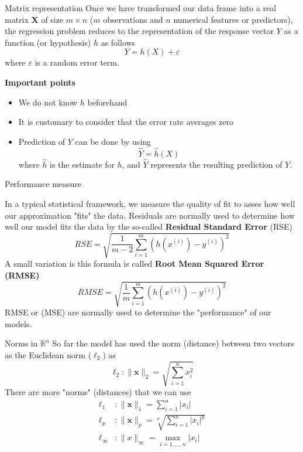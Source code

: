 \documentclass{beamer}
\begin{document}
\begin{frame}{Matrix representation}
	Once we have transformed our data frame into a real matrix $\mathbf{X}$ of size $m \times n$ ($m$ observations and $n$ numerical features or predictors), the regression problem reduces to the representation of the response vector $Y$ as a function (or hypothesis) $h$ as follows
	\begin{equation}
		Y= h(X)+ \varepsilon
	\end{equation}
where $\varepsilon$ is a random error term. 

{\bf Important points}

\begin{itemize}
	\item We do not know $h$ beforehand
	\item It is customary to consider that the error rate averages zero
	\item Prediction of $Y$ can be done by using
	\begin{equation*}
		\hat{Y}= \hat{h} (X)
	\end{equation*}
 where  $\hat{h}$ is the estimate for $h$, and $\hat{Y}$ represents the resulting prediction of $Y$.
\end{itemize}
	
\end{frame}

\begin{frame}{Performance measure}
	
In a typical statistical framework, we measure the quality of fit to asses how well our approximation "fits" the data. Residuals are normally used to determine how well our model fits the data by the so-called  {\bf Residual Standard Error} (RSE)
\begin{equation}
	RSE= \sqrt{\frac{1}{m-2} \sum_{i=1}^m (h(x^{(i)})-y^{(i)})^2}
\end{equation}
A small variation is this formula is called {\bf Root Mean Squared Error (RMSE)}
\begin{equation}
	RMSE= \sqrt{\frac{1}{m} \sum_{i=1}^m (h(x^{(i)})-y^{(i)})^2}
\end{equation}
RMSE or (MSE) are normally used to determine the "performance" of our models.
\end{frame}
\begin{frame}{Norms in $\mathbb{R}^n$}
	So far the model has used the norm (distance) between two vectors as the Euclidean norm ($\ell_2$) as
	\begin{equation*}
		\ell_2 \colon \| \mathbf{x} \|_{2}= \sqrt{ \sum_{i=1}^n x_i^2}
	\end{equation*}
There are more "norms" (distances) that we can use
\begin{equation*}
		\begin{split}
				\ell_1 &\colon \| \mathbf{x} \|_{1}=  \sum_{i=1}^n |x_i|\\
	\ell_p &\colon \| \mathbf{x} \|_{p}= \sqrt[p]{ \sum_{i=1}^n |x_i|^p}	\\
	\ell_\infty&\colon \| x\|_\infty = \max_{i=1,\ldots,n} |x_i|	
		\end{split}
\end{equation*}
\end{frame}
\end{document}
